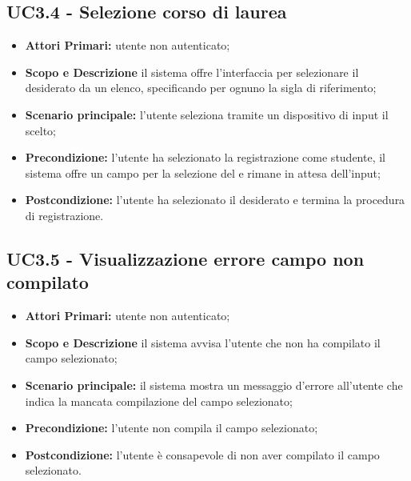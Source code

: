 \documentclass[AnalisiDeiRequisiti.tex]{subfiles}
\begin{document}
\subsection{UC3.4 - Selezione corso di laurea}
\begin{itemize}
	\item \textbf{Attori Primari:} utente non autenticato;
	\item \textbf{Scopo e Descrizione} il sistema offre l'interfaccia per selezionare il  desiderato da un elenco, specificando per ognuno la sigla di riferimento;
	\item \textbf{Scenario principale:} l'utente seleziona tramite un dispositivo di input il  scelto;
	\item \textbf{Precondizione:} l'utente ha selezionato la registrazione come studente, il sistema offre un campo per la selezione del  e rimane in attesa dell'input;
	\item \textbf{Postcondizione:} l'utente ha selezionato il  desiderato e termina la procedura di registrazione.
\end{itemize}

\subsection{UC3.5 - Visualizzazione errore campo non compilato}
\begin{itemize}
	\item \textbf{Attori Primari:} utente non autenticato;
	\item \textbf{Scopo e Descrizione} il sistema avvisa l'utente che non ha compilato il campo selezionato;
	\item \textbf{Scenario principale:} il sistema mostra un messaggio d'errore all'utente che indica la mancata compilazione del campo selezionato;
	\item \textbf{Precondizione:} l'utente non compila il campo selezionato;
	\item \textbf{Postcondizione:} l'utente è consapevole di non aver compilato il campo selezionato.
\end{itemize}
\end{document}
